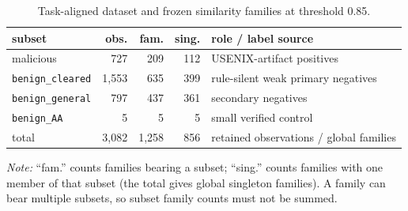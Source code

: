 \begin{table}[t]
  \centering
  \caption{Task-aligned dataset and frozen similarity families at threshold 0.85.}
  \label{tab:dataset-composition}
  \footnotesize
  \setlength{\tabcolsep}{2.3pt}
  \begin{tabular}{@{}p{1.45cm}rrrp{2.25cm}@{}}
    \toprule
    subset & obs. & fam. & sing. & role / label source \\
    \midrule
    malicious & 727 & 209 & 112 & USENIX-artifact positives \\
    \texttt{benign\_cleared} & 1,553 & 635 & 399 & rule-silent weak primary negatives \\
    \texttt{benign\_general} & 797 & 437 & 361 & secondary negatives \\
    \texttt{benign\_AA} & 5 & 5 & 5 & small verified control \\
    \midrule
    total & 3,082 & 1,258 & 856 & retained observations / global families \\
    \bottomrule
  \end{tabular}
  \vspace{2pt}

  \parbox{\columnwidth}{\footnotesize \emph{Note:} ``fam.'' counts families bearing a subset; ``sing.'' counts families with one member of that subset (the total gives global singleton families). A family can bear multiple subsets, so subset family counts must not be summed.}
\end{table}
